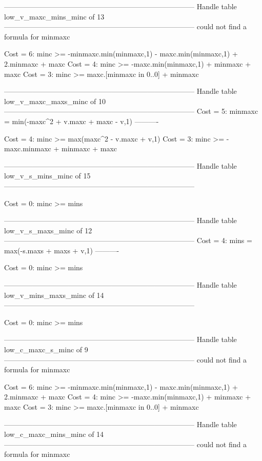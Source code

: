 --------------------------------------------------------------------------------
Handle table low_v_maxc_mins_minc of 13
--------------------------------------------------------------------------------
could not find a formula for minmaxc

Cost =  6:  minc >= -minmaxc.min(minmaxc,1) - maxc.min(minmaxc,1) + 2.minmaxc + maxc
Cost =  4:  minc >= -maxc.min(minmaxc,1) + minmaxc + maxc
Cost =  3:  minc >= maxc.[minmaxc in 0..0] + minmaxc

--------------------------------------------------------------------------------
Handle table low_v_maxc_maxs_minc of 10
--------------------------------------------------------------------------------
Cost =  5:  minmaxc = min(-maxc^2 + v.maxc + maxc - v,1)
----------

Cost =  4:  minc >= max(maxc^2 - v.maxc + v,1)
Cost =  3:  minc >= -maxc.minmaxc + minmaxc + maxc

--------------------------------------------------------------------------------
Handle table low_v_s_mins_minc of 15
--------------------------------------------------------------------------------

Cost =  0:  minc >= mins

--------------------------------------------------------------------------------
Handle table low_v_s_maxs_minc of 12
--------------------------------------------------------------------------------
Cost =  4:  mins = max(-s.maxs + maxs + v,1)
----------

Cost =  0:  minc >= mins

--------------------------------------------------------------------------------
Handle table low_v_mins_maxs_minc of 14
--------------------------------------------------------------------------------

Cost =  0:  minc >= mins

--------------------------------------------------------------------------------
Handle table low_c_maxc_s_minc of 9
--------------------------------------------------------------------------------
could not find a formula for minmaxc

Cost =  6:  minc >= -minmaxc.min(minmaxc,1) - maxc.min(minmaxc,1) + 2.minmaxc + maxc
Cost =  4:  minc >= -maxc.min(minmaxc,1) + minmaxc + maxc
Cost =  3:  minc >= maxc.[minmaxc in 0..0] + minmaxc

--------------------------------------------------------------------------------
Handle table low_c_maxc_mins_minc of 14
--------------------------------------------------------------------------------
could not find a formula for minmaxc

